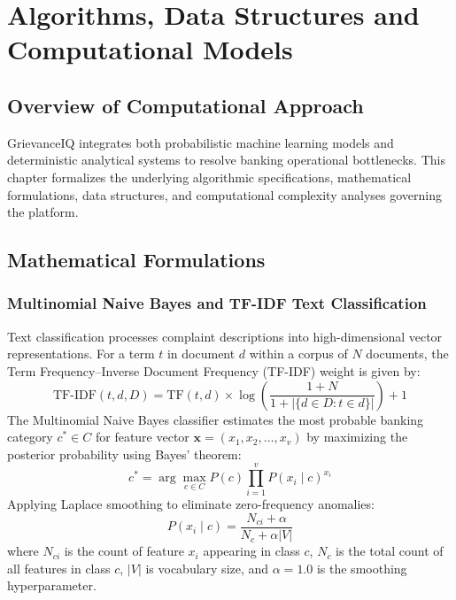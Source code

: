 \chapter{Algorithms, Data Structures and Computational Models}

\section{Overview of Computational Approach}
GrievanceIQ integrates both probabilistic machine learning models and deterministic analytical systems to resolve banking operational bottlenecks. This chapter formalizes the underlying algorithmic specifications, mathematical formulations, data structures, and computational complexity analyses governing the platform.

\section{Mathematical Formulations}

\subsection{Multinomial Naive Bayes and TF-IDF Text Classification}
Text classification processes complaint descriptions into high-dimensional vector representations. For a term $t$ in document $d$ within a corpus of $N$ documents, the Term Frequency--Inverse Document Frequency (TF-IDF) weight is given by:
\begin{equation}
\text{TF-IDF}(t, d, D) = \text{TF}(t, d) \times \log\left(\frac{1 + N}{1 + |\{d \in D : t \in d\}|}\right) + 1
\end{equation}
The Multinomial Naive Bayes classifier estimates the most probable banking category $c^* \in C$ for feature vector $\mathbf{x} = (x_1, x_2, \dots, x_v)$ by maximizing the posterior probability using Bayes' theorem:
\begin{equation}
c^* = \arg\max_{c \in C} P(c) \prod_{i=1}^{v} P(x_i \mid c)^{x_i}
\end{equation}
Applying Laplace smoothing to eliminate zero-frequency anomalies:
\begin{equation}
P(x_i \mid c) = \frac{N_{ci} + \alpha}{N_c + \alpha |V|}
\end{equation}
where $N_{ci}$ is the count of feature $x_i$ appearing in class $c$, $N_c$ is the total count of all features in class $c$, $|V|$ is vocabulary size, and $\alpha = 1.0$ is the smoothing hyperparameter.

